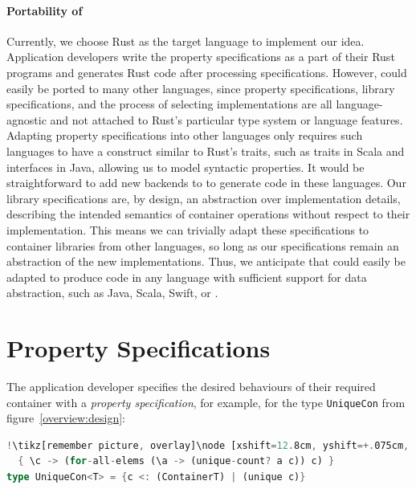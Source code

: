 \paragraph*{Portability of \Primrose{}}
\label{implementation:portability}
Currently, we choose Rust as the target language to implement our idea. Application developers write the property specifications as a part of their Rust programs and \Primrose{} generates Rust code after processing specifications. 
However, \Primrose{} could easily be ported to many other languages, since property specifications, 
library specifications, and the process of selecting implementations are all language-agnostic and not attached to Rust's particular type system or language features.
Adapting property specifications into other languages only requires such languages to have a construct similar to Rust's traits, 
such as traits in Scala and interfaces in Java, allowing us to model syntactic properties. It would be straightforward to add new backends to \Primrose{} to 
generate code in these languages. Our library specifications are, by design, an abstraction over implementation details, describing the intended semantics of container operations without respect to 
their implementation. This means we can trivially adapt these specifications to container libraries from other languages, so long as our specifications remain an abstraction of the 
new implementations.  Thus, we anticipate that \Primrose{} could easily be adapted to produce code in any language with sufficient support for data abstraction, such as Java, Scala, Swift, or \Cpp.

\section{Property Specifications}
\label{chap2:prop}
The application developer specifies the desired behaviours of their required container with a \textit{property specification},
%
for example, for the type \lstinline{UniqueCon} from figure~\ref{overview:design}:
\begin{lstlisting}[language=Rust, style=boxed, escapechar=!]
!\tikz[remember picture, overlay]\node [xshift=12.8cm, yshift=+.075cm, inner sep=0.075cm, rectangle] {\footnotesize\bfseries\texttt{Primrose}};!property unique 
  { \c -> (for-all-elems (\a -> (unique-count? a c)) c) }
type UniqueCon<T> = {c <: (ContainerT) | (unique c)}
\end{lstlisting}

